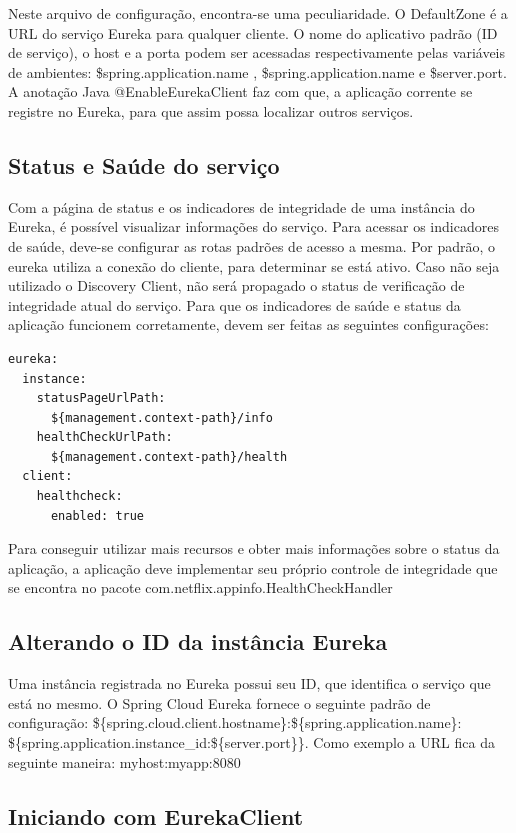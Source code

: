 \documentclass[journal]{IEEEtran}
\begin{document}
Neste arquivo de configuração, encontra-se uma peculiaridade. O DefaultZone é a URL do serviço Eureka para qualquer cliente. O nome do aplicativo padrão (ID de serviço), o host e a porta podem ser acessadas respectivamente pelas variáveis de ambientes: \${spring.application.name} , \${spring.application.name} e \${server.port}.
A anotação Java @EnableEurekaClient faz com que, a aplicação corrente se registre no Eureka, para que assim possa localizar outros serviços.

\subsection{Status e Saúde do serviço}

Com a página de status e os indicadores de integridade de uma instância do Eureka, é possível visualizar informações do serviço. Para acessar os indicadores de saúde, deve-se configurar as rotas padrões de acesso a mesma. Por padrão, o eureka utiliza a conexão do cliente, para determinar se está ativo. Caso não seja utilizado o Discovery Client, não será propagado o status de verificação de integridade atual do serviço. Para que os indicadores de saúde e status da aplicação funcionem corretamente, devem ser feitas as seguintes configurações:

\begin{verbatim}
eureka:
  instance:
    statusPageUrlPath: 
      ${management.context-path}/info
    healthCheckUrlPath: 
      ${management.context-path}/health
  client:
    healthcheck:
      enabled: true
\end{verbatim}

Para conseguir utilizar mais recursos e obter mais informações sobre o status da aplicação, a aplicação deve implementar seu próprio controle de integridade que se encontra no pacote com.netflix.appinfo.HealthCheckHandler

\subsection{Alterando o ID da instância Eureka}

Uma instância registrada no Eureka possui seu ID, que identifica o serviço que está no mesmo. O Spring Cloud Eureka fornece o seguinte padrão de configuração: \$\{spring.cloud.client.hostname\}:\$\{spring.application.name\}:
\$\{spring.application.instance\_id:\$\{server.port\}\}. Como exemplo a URL fica da seguinte maneira: myhost:myapp:8080

\subsection{Iniciando com EurekaClient}
\end{document}
